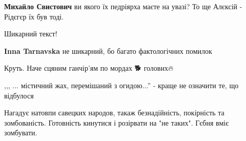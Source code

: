 \begin{itemize}
\begin{itemize}
\textbf{Михайло Свистович} ви якого їх педріярха маєте на увазі? То ще Алєксій - Рідєгєр їх був тоді.
\end{itemize}

 
Шикарний текст!

\begin{itemize}
 
\textbf{Inna Tarnavska} не шикарний, бо багато фактологічних помилок
\end{itemize}

 
Круть. Наче сцяним ганчір'ям по мордах 🐕 голових🔥

 
,,, ... містичний жах, перемішаний з огидою...'' - краще не означити те, що відбулося

 

Нагадує натовпи савецких народов, такаж безнадійність, покірність та
зомбованість. Готовність кинутися і розірвати на "не таких". Гєбня вміє
зомбувати.


 

\end{itemize}
